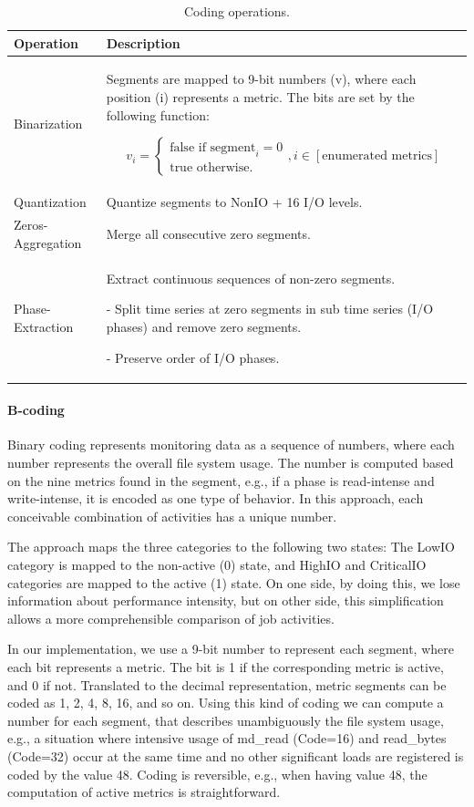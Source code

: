 \documentclass{jhps}
\begin{document}
\begin{table}[t]
 \centering
 \begin{tabularx}{\textwidth}{lX}
	 Operation &  Description \\
	 \midrule
	 Binarization & Segments are mapped to 9-bit numbers (v), where each position (i) represents a metric.
The bits are set by the following function:

	 \vbox{
		\begin{equation}
			v_i =
			\begin{cases}
				\text{false if segment}_i = 0\\\text{true otherwise.}
			\end{cases}, i \in [\text{enumerated metrics}]
		\end{equation}
	 } \\[-1em]
	 Quantization & Quantize segments to NonIO + 16 I/O levels.\\
	 Zeros-Aggregation & Merge all consecutive zero segments.\\
	 Phase-Extraction &  Extract continuous sequences of non-zero segments.
\par - Split time series at zero segments in sub time series (I/O phases) and remove zero segments.
\par - Preserve order of I/O phases.\\
 \end{tabularx}
 \caption{Coding operations.}
 \label{tab:coding_ops}
\end{table}

\paragraph{B-coding}
Binary coding represents monitoring data as a sequence of numbers, where each number represents the overall file system usage.
The number is computed based on the nine metrics found in the segment, e.g., if a phase is read-intense and write-intense, it is encoded as one type of behavior.
In this approach, each conceivable combination of activities has a unique number.

The approach maps the three categories to the following two states: The LowIO category is mapped to the non-active (0) state, and HighIO and CriticalIO categories are mapped to the active (1) state.
On one side, by doing this, we lose information about performance intensity, but on other side, this simplification allows a more comprehensible comparison of job activities.

In our implementation, we use a 9-bit number to represent each segment, where each bit represents a metric.
The bit is 1 if the corresponding metric is active, and 0 if not.
Translated to the decimal representation, metric segments can be coded as 1, 2, 4, 8, 16, and so on.
Using this kind of coding we can compute a number for each segment, that describes unambiguously the file system usage, e.g., a situation where intensive usage of md\_read (Code=16) and read\_bytes (Code=32) occur at the same time and no other significant loads are registered is coded by the value 48.
Coding is reversible, e.g., when having value 48, the computation of active metrics is straightforward.
\end{document}

